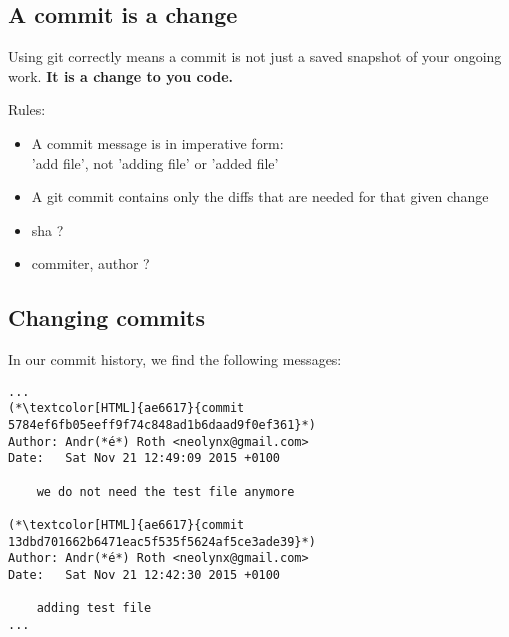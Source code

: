 \subsection{A commit is a change}
\begin{frame}[fragile]
  \subslidetitle

  Using git correctly means a commit is not just a saved snapshot of your ongoing work. \textbf{It is a change to you code.}

  \vspace{1em}
  Rules:
  \begin{itemize}
    \item A commit message is in imperative form: \\
      'add file', not 'adding file' or 'added file'
    \item A git commit contains only the diffs that are needed for that given change
    \item sha ?
      \item commiter, author ?

  \end{itemize}
\end{frame}


\subsection{Changing commits}
\begin{frame}[fragile]
  \subslidetitle

  In our commit history, we find the following messages:
  \begin{lstlisting}
...
(*\textcolor[HTML]{ae6617}{commit 5784ef6fb05eeff9f74c848ad1b6daad9f0ef361}*)
Author: Andr(*é*) Roth <neolynx@gmail.com>
Date:   Sat Nov 21 12:49:09 2015 +0100

    we do not need the test file anymore

(*\textcolor[HTML]{ae6617}{commit 13dbd701662b6471eac5f535f5624af5ce3ade39}*)
Author: Andr(*é*) Roth <neolynx@gmail.com>
Date:   Sat Nov 21 12:42:30 2015 +0100

    adding test file
...
\end{lstlisting}
\end{frame}


